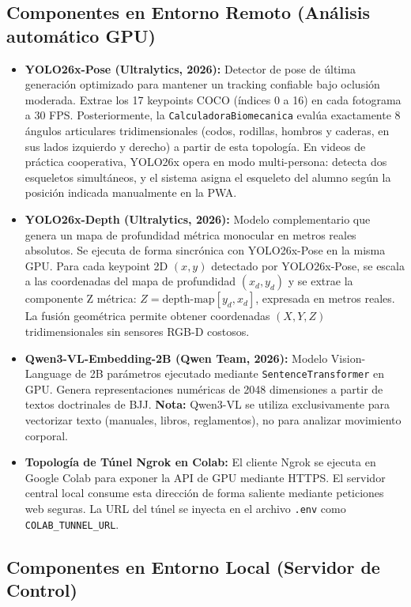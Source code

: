 \documentclass[12pt,letterpaper]{article}
\begin{document}
\subsection{Componentes en Entorno Remoto (Análisis automático GPU)}

\begin{itemize}
    \item \textbf{YOLO26x-Pose (Ultralytics, 2026):} Detector de pose de última generación optimizado para mantener un tracking confiable bajo oclusión moderada. Extrae los 17 keypoints COCO (índices 0 a 16) en cada fotograma a 30 FPS. Posteriormente, la \texttt{CalculadoraBiomecanica} evalúa exactamente 8 ángulos articulares tridimensionales (codos, rodillas, hombros y caderas, en sus lados izquierdo y derecho) a partir de esta topología. En videos de práctica cooperativa, YOLO26x opera en modo multi-persona: detecta dos esqueletos simultáneos, y el sistema asigna el esqueleto del alumno según la posición indicada manualmente en la PWA.
    \item \textbf{YOLO26x-Depth (Ultralytics, 2026):} Modelo complementario que genera un mapa de profundidad métrica monocular en metros reales absolutos. Se ejecuta de forma sincrónica con YOLO26x-Pose en la misma GPU. Para cada keypoint 2D $(x, y)$ detectado por YOLO26x-Pose, se escala a las coordenadas del mapa de profundidad $(x_d, y_d)$ y se extrae la componente Z métrica: $Z = \text{depth-map}[y_d, x_d]$, expresada en metros reales. La fusión geométrica permite obtener coordenadas $(X, Y, Z)$ tridimensionales sin sensores RGB-D costosos.
    \item \textbf{Qwen3-VL-Embedding-2B (Qwen Team, 2026):} Modelo Vision-Language de 2B parámetros ejecutado mediante \texttt{Sentence\allowbreak Transformer} en GPU. Genera representaciones numéricas de 2048 dimensiones a partir de textos doctrinales de BJJ. \textbf{Nota:} Qwen3-VL se utiliza exclusivamente para vectorizar texto (manuales, libros, reglamentos), no para analizar movimiento corporal.
    \item \textbf{Topología de Túnel Ngrok en Colab:} El cliente Ngrok se ejecuta en Google Colab para exponer la API de GPU mediante HTTPS. El servidor central local consume esta dirección de forma saliente mediante peticiones web seguras. La URL del túnel se inyecta en el archivo \texttt{.\allowbreak env} como \texttt{COLAB\_\allowbreak TUNNEL\_\allowbreak URL}.
\end{itemize}

\subsection{Componentes en Entorno Local (Servidor de Control)}
\end{document}
